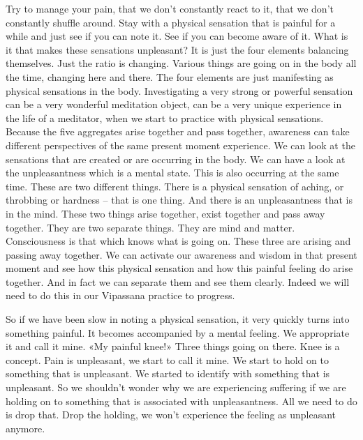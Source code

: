 \documentclass[letterpaper,10pt,english]{sphinxmanual}
\begin{document}
\sphinxAtStartPar
Try to manage your pain, that we don’t constantly react to it, that we
don’t constantly shuffle around. Stay with a physical sensation that is painful
for a while and just see if you can note it. See if you can become aware of it.
What  is  it  that  makes  these  sensations  unpleasant?  It  is  just  the  four
  elements  balancing  themselves.  Just  the  ratio  is  changing.  Various  things
are  going  on  in  the  body  all  the  time,  changing  here  and  there.  The  four
elements are just manifesting as physical sensations in the body. Investigating a very strong or powerful sensation can be a very wonderful meditation
object, can be a very unique experience in the life of a meditator, when we
start to practice with physical sensations. Because the five aggregates arise
together and pass together, awareness can take different perspectives of the
same present moment experience. We can look at the sensations that are created or are occurring in the body. We can have a look at the unpleasantness
which is a mental state. This is also occurring at the same time. These are
two different things. There is a physical sensation of aching, or throbbing
or hardness – that is one thing. And there is an unpleasantness that is in the
mind.
These two things
arise together, exist together and pass away together. They are two separate
things. They are mind and matter. Consciousness is that which knows what
is going on. These three are arising and passing away together. We can activate  our  awareness  and  wisdom  in  that  present  moment  and  see  how  this
physical sensation and how this painful feeling do arise together. And in fact
we can separate them and see them clearly. Indeed we will need to do this in
our Vipassana practice to progress.

\sphinxAtStartPar
So if we have been slow in noting a physical sensation, it very quickly
turns into something painful. It becomes accompanied by a mental feeling.
We appropriate it and call it mine. «My painful knee!» Three things going
on there. Knee is a concept. Pain is unpleasant, we start to call it mine. We
start to hold on to something that is unpleasant. We started to identify with
something that is unpleasant. So we shouldn’t wonder why we are experiencing suffering if we are holding on to something that is associated with
unpleasantness. All we need to do is drop that. Drop the holding, we won’t
experience the feeling as unpleasant anymore.
\end{document}
